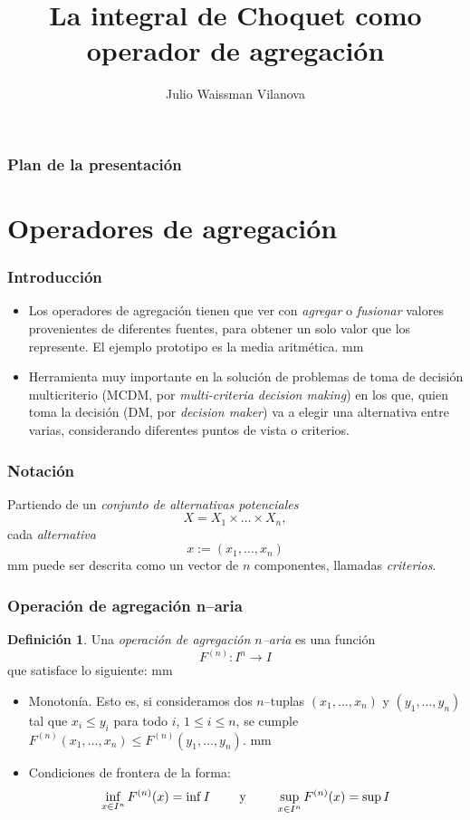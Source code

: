 \documentclass{beamer}
\title[Integral de Choquet] %
{La integral de Choquet como operador de agregación}
\author[Waissman]{Julio Waissman Vilanova}
\institute[UNISON] %
{Departamento de Matem\'aticas\\
 \textbf{Universidad de Sonora}\\
}
\date{}
\theoremstyle{definition}
\newtheorem{Def}{Definición}
\begin{document}
\begin{frame}
  \titlepage
\end{frame}

\begin{frame}
  \frametitle{Plan de la presentación}
  \tableofcontents
\end{frame}


\section{Operadores de agregación}
\begin{frame}
  \frametitle{Introducción}
  \begin{itemize}
  \item Los operadores de agregación tienen que ver con \emph{agregar}
    o \emph{fusionar} valores provenientes de diferentes fuentes, para
    obtener un solo valor que los represente. El ejemplo prototipo es
    la media aritmética.   mm
  \item Herramienta muy importante en la solución de problemas de toma
    de decisión multicriterio (MCDM, por \emph {multi-criteria
      decision making}) en los que, quien toma la decisión (DM, por
    \emph {decision maker}) va a elegir una alternativa entre varias,
    considerando diferentes puntos de vista o criterios.
  \end{itemize}
\end{frame}

\begin{frame}
  \frametitle{Notación}
  Partiendo de un \emph{conjunto de alternativas potenciales}
    $$
    X=X_1\times \ldots \times X_n,
    $$
    cada \emph{alternativa}
    $$
    x:=(x_1, \ldots, x_n)
    $$ 
     mm
    puede ser descrita como un vector de $n$ componentes, llamadas
    \emph{criterios}.
  \end{frame}
  \begin{frame}
    \frametitle{Operación de agregación n--aria}
    \begin{Def}
      Una \emph{operación de agregación $n$--aria} es una función
	$$
	F^{(n)}:I^n \to I
	$$
	que satisface lo siguiente:  mm
	\begin{itemize}
        \item Monotonía. Esto es, si consideramos dos $n$--tuplas
          $(x_1, \ldots, x_n)$ y $(y_1, \ldots, y_n)$ tal que
          $x_i \le y_i$ para todo $i$, $1 \le i \le n$, se cumple
          $F^{(n)}(x_1, \ldots, x_n ) \le F^{(n)} (y_1, \ldots, y_n)$.
           mm
        \item Condiciones de frontera de la forma:
		$$
		\inf_{x \in I^n} F^{(n)}(x) = \inf I \mbox{\hspace{7
                    mm} y \hspace{7 mm}} \sup_{x \in I^n} F^{(n)}(x) =
                \sup I
		$$
              \end{itemize}
            \end{Def}
          \end{frame}
\end{document}
